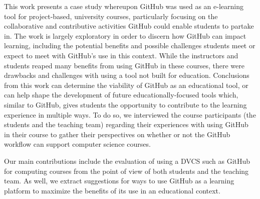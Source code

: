 This work presents a case study whereupon GitHub was used as an e-learning tool for project-based, university courses, particularly focusing on the collaborative and contributive activities GitHub could enable students to partake in. The work is largely exploratory in order to discern how GitHub can impact learning, including the potential benefits and possible challenges students meet or expect to meet with GitHub's use in this context. While the instructors and students reaped many benefits from using GitHub in these courses, there were drawbacks and challenges with using a tool not built for education. Conclusions from this work can determine the viability of GitHub as an educational tool, or can help shape the development of future educationally-focused tools which, similar to GitHub, gives students the opportunity to contribute to the learning experience in multiple ways. To do so, we interviewed the course participants (the students and the teaching team) regarding their experiences with using GitHub in their course to gather their perspectives on whether or not the GitHub workflow can support computer science courses.

Our main contributions include the evaluation of using a DVCS such as GitHub for computing courses from the point of view of both students and the teaching team. As well, we extract suggestions for ways to use GitHub as a learning platform to maximize the benefits of its use in an educational context.

%



